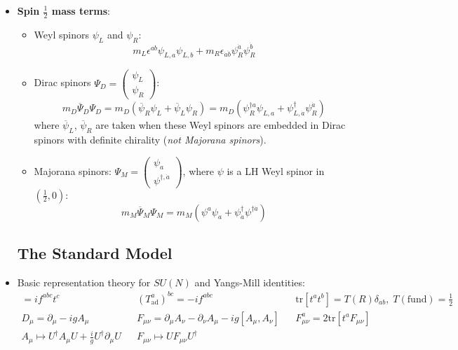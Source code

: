 \documentclass[11pt, oneside]{article}   	%
\theoremstyle{definition}
\numberwithin{equation}{subsection}		%
\begin{document}
\begin{itemize}
	\item \textbf{Spin $\frac{1}{2}$ mass terms}: 
	\begin{itemize}
		\item Weyl spinors $\psi_L$ and $\psi_R$:
		\begin{equation}
			m_L \epsilon^{ab}\psi_{L, a}\psi_{L, b} + m_R \epsilon_{\dot a\dot b} \psi_R^{\dot a} \psi_R^{\dot b}
		\end{equation}
		\item Dirac spinors $\Psi_D = \begin{pmatrix} \psi_L \\ \psi_R \end{pmatrix}$:
		\begin{equation}
			m_D\overline\Psi_D\Psi_D = m_D(\overline\psi_R \psi_L + \overline \psi_L \psi_R) = m_D(\psi_R^{\dagger a} \psi_{L, a} + \psi_{L, \dot a}^\dagger \psi_R^{\dot a})
		\end{equation}
		where $\overline\psi_L$, $\overline\psi_R$ are taken when these Weyl spinors are embedded in Dirac spinors with definite chirality (\textit{not Majorana spinors}). 
		\item Majorana spinors: $\Psi_M = \begin{pmatrix} \psi_{a} \\ \psi^{\dagger, \dot a} \end{pmatrix}$, where $\psi$ is a LH Weyl spinor in $(\frac{1}{2}, 0)$:
		\begin{equation}
			m_M \overline\Psi_M \Psi_M = m_M (\psi^a \psi_a + \psi^\dagger_{\dot a} \psi^{\dagger\dot a})
		\end{equation}
	\end{itemize}
	
	\newpage
	\subsection{The Standard Model}
	
	\item Basic representation theory for $SU(N)$ and Yangs-Mill identities:
	\begin{align}
		[t^a, t^b] = i f^{abc} t^c && \left(T_\mathrm{ad}^a\right)^{bc} = -i f^{abc} && \mathrm{tr}[t^a t^b] = T(R) \delta_{ab}, \;T(\mathrm{fund}) = \frac{1}{2} \nonumber \\
		D_\mu = \partial_\mu - i g A_\mu && F_{\mu\nu} = \partial_\mu A_\nu - \partial_\nu A_\mu - ig [A_\mu, A_\nu] && F_{\mu\nu}^a = 2\mathrm{tr}[t^a F_{\mu\nu}] \nonumber \\
		A_\mu\mapsto U^\dagger A_\mu U + \frac{i}{g} U^\dagger \partial_\mu U && F_{\mu\nu}\mapsto U F_{\mu\nu} U^\dagger
	\end{align}
	

\end{itemize}
\end{document}
